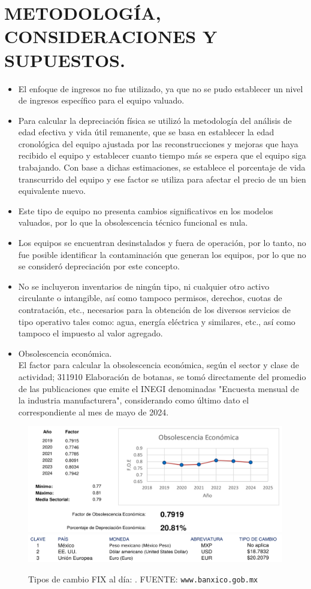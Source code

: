 
\chapter{METODOLOGÍA, CONSIDERACIONES Y SUPUESTOS.} %
\begin{itemize}
	\item El enfoque de ingresos no fue utilizado, ya que no se pudo establecer un nivel de ingresos específico para el equipo valuado.
	\item Para calcular la depreciación física se utilizó la metodología del análisis de edad efectiva y vida útil remanente, que se basa en establecer la edad cronológica del equipo ajustada por las reconstrucciones y mejoras que haya recibido el equipo y establecer cuanto tiempo más se espera que el equipo siga trabajando. 
	Con base a dichas estimaciones, se establece el porcentaje de vida transcurrido del equipo y ese factor se utiliza para afectar el precio de un bien equivalente nuevo.
\item Este tipo de equipo no presenta cambios significativos en los modelos valuados, por lo que la obsolescencia técnico funcional es nula.
\item Los equipos se encuentran desinstalados y fuera de operación, por lo tanto, no fue posible identificar la contaminación que generan los equipos, por lo que no se consideró depreciación por este concepto. 
\item No se incluyeron inventarios de ningún tipo, ni cualquier otro activo circulante o intangible, así como tampoco permisos, derechos, cuotas de contratación, etc., necesarios para la obtención de los diversos servicios de tipo operativo tales como: agua, energía eléctrica y similares, etc., así como tampoco el impuesto al valor agregado.
\item Obsolescencia económica. \\ 
El factor para calcular la obsolescencia económica, según el sector y clase de actividad; 311910 Elaboración de botanas, se tomó directamente del promedio de las publicaciones que emite el INEGI denominadas "Encuesta mensual de la industria manufacturera", considerando como último dato el correspondiente al mes de mayo de 2024.
\end{itemize}
\begin{figure}[hbtp!]
	\centering
	\includegraphics[width= \linewidth]{../0.imagenes/CAP_6/1}
	\includegraphics[width= \linewidth]{../0.imagenes/CAP_6/2}
	\caption{Tipos de cambio FIX al día: \fechaInforme. FUENTE: \texttt{www.banxico.gob.mx}}
\end{figure}
